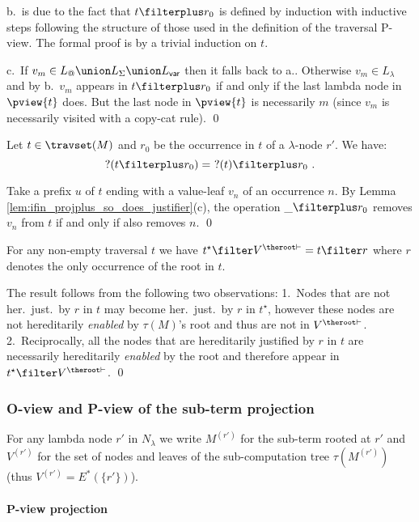 b.\ is due to the fact that $t\filterplus r_0$ is defined by
induction with inductive steps following the structure of those used
in the definition of the traversal P-view. The formal proof is by a
trivial induction on $t$.

c.\ If $v_m \in L_@ \union L_\Sigma \union L_{\sf var}$ then it
falls back to a.. Otherwise $v_m \in L_\lambda$ and by b.\, $v_m$
appears in $t\filterplus r_0$ if and only if the last lambda node in
$\pview{t}$ does. But the last node in $\pview{t}$ is necessarily
$m$ (since $v_m$ is necessarily visited with a copy-cat rule). \qed
\smallskip


\begin{lemma}
\label{lem:projplus_pendingnode}
 Let $t \in \travset(M)$ and $r_0$ be the occurrence in $t$ of a $\lambda$-node $r'$.
 We have:
  $$?(t\filterplus r_0) =\ ?(t) \filterplus r_0 \ .$$
\end{lemma}
\proof Take a prefix $u$ of $t$ ending with a value-leaf $v_n$ of an
occurrence $n$. By Lemma
\ref{lem:ifin_projplus_so_does_justifier}(c), the operation $\_
\filterplus r_0$ removes $v_n$ from $t$ if and only if also removes
$n$. \qed
\smallskip

\begin{lemma}
\label{lem:he_proj_root_is_hj_proj_r} For any non-empty traversal
$t$ we have  $t^\star\filter V^{\theroot\vdash} = t \filter r$ where
$r$ denotes the only occurrence of the root in $t$.
\end{lemma}
\proof The result follows from the following two observations: 1.\
Nodes that are not her.\ just.\ by $r$ in $t$ may become her.\
just.\ by $r$ in $t^\star$, however these nodes are not hereditarily
\emph{enabled}
 by $\tau(M)$'s root and thus are not in $V^{\theroot\vdash}$.
2.\ Reciprocally, all the nodes that are hereditarily justified by
$r$ in $t$ are necessarily hereditarily \emph{enabled} by the root
and therefore appear in $t^\star \filter V^{\theroot\vdash}$. \qed


\subsubsection{O-view and P-view of the sub-term projection}

For any lambda node $r'$ in $N_\lambda$ we write
$M^{(r')}$ for the sub-term rooted at $r'$ and $V^{(r')}$ for the set of nodes and leaves of the sub-computation tree $\tau(M^{(r')})$ (thus $V^{(r')} = E^*(\{r'\})$).

\paragraph{P-view projection}


